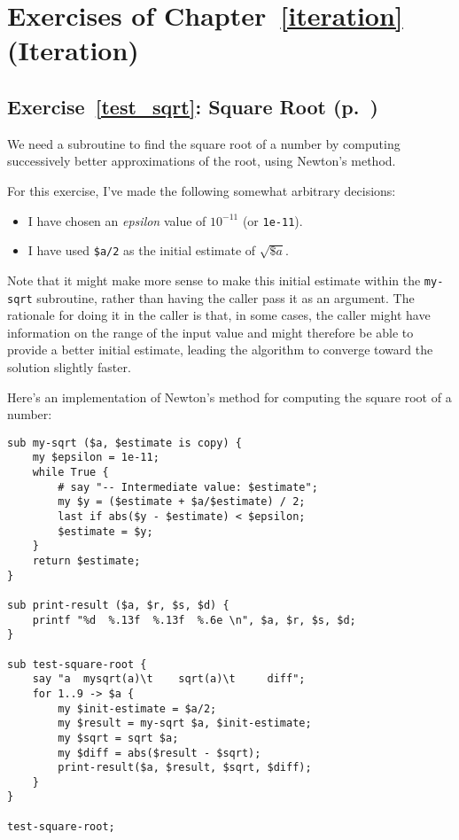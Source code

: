 \section{Exercises of Chapter~\ref{iteration} (Iteration)}
 

\subsection{Exercise~\ref{test_sqrt}: Square Root (p.~\pageref{test_sqrt})}
\label{sol_test_sqrt}

We need a subroutine to find the square root of a number by 
computing successively better approximations of the root, using 
Newton's method.

For this exercise, I've made the following somewhat 
arbitrary decisions:
\begin{itemize}
\item I have chosen an \emph{epsilon} value of $10^{-11}$ (or {\tt 1e-11}).
\item I have used \verb'$a/2' as the initial estimate 
of $\sqrt{\$a}$. 
\end{itemize}

Note that it might make more sense to make this 
initial estimate within the {\tt my-sqrt} subroutine, 
rather than having the caller pass it as an argument. The 
rationale for doing it in the caller is that, in some cases, 
the caller might have information on the range of the input 
value and might therefore be able to provide a better 
initial estimate, leading the algorithm to converge toward 
the solution slightly faster.

Here's an implementation of Newton's method for computing 
the square root of a number:

\begin{verbatim}
sub my-sqrt ($a, $estimate is copy) {
    my $epsilon = 1e-11;
    while True {
        # say "-- Intermediate value: $estimate";
        my $y = ($estimate + $a/$estimate) / 2;
        last if abs($y - $estimate) < $epsilon;
        $estimate = $y;
    }
    return $estimate;
}

sub print-result ($a, $r, $s, $d) {
    printf "%d  %.13f  %.13f  %.6e \n", $a, $r, $s, $d;
}

sub test-square-root {
    say "a  mysqrt(a)\t    sqrt(a)\t     diff";
    for 1..9 -> $a {
        my $init-estimate = $a/2;
        my $result = my-sqrt $a, $init-estimate;
        my $sqrt = sqrt $a;
        my $diff = abs($result - $sqrt);
        print-result($a, $result, $sqrt, $diff);
    }
}
    
test-square-root;
\end{verbatim}

